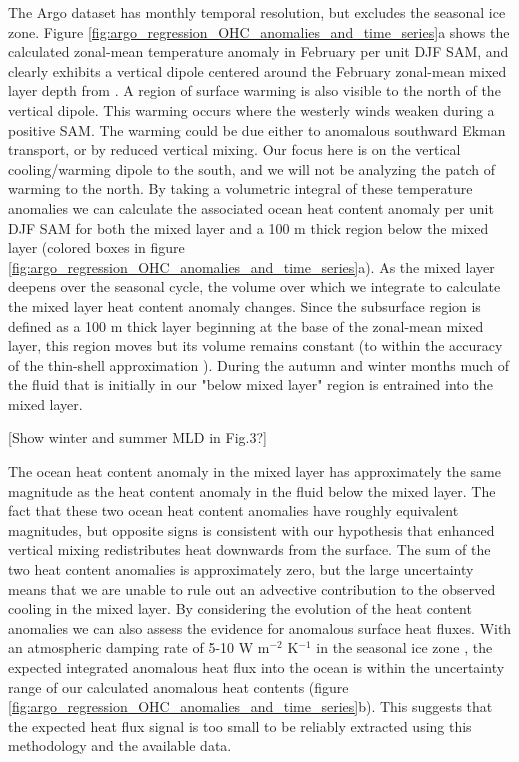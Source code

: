 \documentclass{ametsocV5}
\begin{document}
The Argo dataset has monthly temporal resolution, but excludes the seasonal ice zone. Figure \ref{fig:argo_regression_OHC_anomalies_and_time_series}a shows the calculated zonal-mean temperature anomaly in February per unit DJF SAM, and clearly exhibits a vertical dipole centered around the February zonal-mean mixed layer depth from \citet{Holte2017}. A region of surface warming is also visible to the north of the vertical dipole. This warming occurs where the westerly winds weaken during a positive SAM. The warming could be due either to anomalous southward Ekman transport, or by reduced vertical mixing. Our focus here is on the vertical cooling/warming dipole to the south, and we will not be analyzing the patch of warming to the north. By taking a volumetric integral of these temperature anomalies we can calculate the associated ocean heat content anomaly per unit DJF SAM for both the mixed layer and a 100 m thick region below the mixed layer (colored boxes in figure \ref{fig:argo_regression_OHC_anomalies_and_time_series}a). As the mixed layer deepens over the seasonal cycle, the volume over which we integrate to calculate the mixed layer heat content anomaly changes. Since the subsurface region is defined as a 100 m thick layer beginning at the base of the zonal-mean mixed layer, this region  moves but its volume remains constant (to within the accuracy of the thin-shell approximation \citep{Vallis2006}). During the autumn and winter months much of the fluid that is initially in our "below mixed layer" region is entrained into the mixed layer.

[Show winter and summer MLD in Fig.3?]

The ocean heat content anomaly in the mixed layer has approximately the same magnitude as the heat content anomaly in the fluid below the mixed layer. The fact that these two ocean heat content anomalies have roughly equivalent magnitudes, but opposite signs is consistent with our hypothesis that enhanced vertical mixing redistributes heat downwards from the surface. The sum of the two heat content anomalies is approximately zero, but the large uncertainty means that we are unable to rule out an advective contribution to the observed cooling in the mixed layer. By considering the evolution of the heat content anomalies we can also assess the evidence for anomalous surface heat fluxes. With an atmospheric damping rate of 5-10 W m$^{-2}$ K$^{-1}$ in the seasonal ice zone \citep{Hausmann2016}, the expected integrated anomalous heat flux into the ocean is within the uncertainty range of our calculated anomalous heat contents (figure \ref{fig:argo_regression_OHC_anomalies_and_time_series}b). This suggests that the expected heat flux signal is too small to be reliably extracted using this methodology and the available data.
\end{document}
